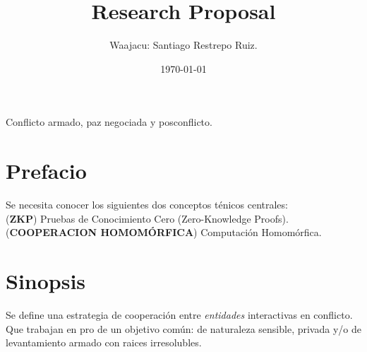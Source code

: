 \documentclass[12pt]{article}
\begin{document}
\title{Research Proposal}
\author{Waajacu: Santiago Restrepo Ruiz.}
\date{\today}



\makeatletter
\renewcommand{\maketitle}{
  \begin{titlepage}
    \begin{center}
      {\huge\bfseries \@title} %
      \vspace{2cm}
      
      {\large\itshape \@author} %
      
      \vspace{1cm}
      
      {\large \@date} %
      
      \vspace{2cm}
      
      {\large Conflicto armado, paz negociada y posconflicto.}
      
      \vfill
    \end{center}
  \end{titlepage}
}
\makeatother

\maketitle

\section{Prefacio}
Se necesita conocer los siguientes dos conceptos ténicos centrales: \\

{ (\textbf{ZKP}) Pruebas de Conocimiento Cero (Zero-Knowledge Proofs).}\\

{ (\textbf{COOPERACION HOMOMÓRFICA}) Computación Homomórfica.}\\

\section{Sinopsis}
Se define una estrategia de cooperación entre \textit{entidades} interactivas 
en conflicto. Que trabajan en pro de un objetivo común: de naturaleza sensible, privada y/o 
de levantamiento armado con raices irresolubles. \\
\end{document}
